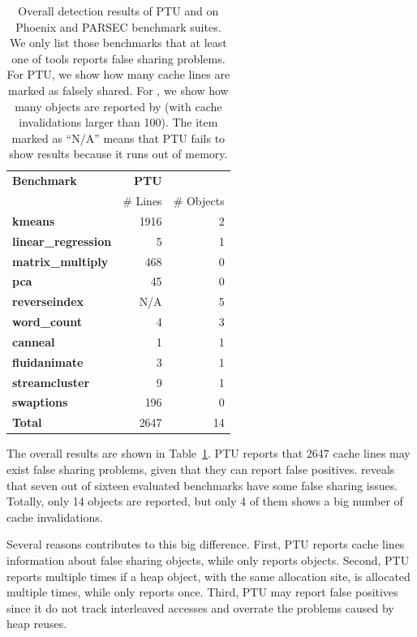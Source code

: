 \begin{table}
\centering
\begin{tabular}{l|r|r}
\hline
{\bf \small Benchmark} & {\bf \small PTU} & {\bf \small \sheriffdetect{}}\\
 & {\# Lines} & {\# Objects}\\
\hline
\small \textbf{kmeans} & 1916 &  2 \\
\small \textbf{linear\_regression} & 5 & 1 \\
\small \textbf{matrix\_multiply} & 468 & 0\\
\small \textbf{pca} & 45 & 0 \\
\small \textbf{reverseindex} & N/A & 5 \\
\small \textbf{word\_count} & 4 & 3\\
\hline
\small \textbf{canneal} & 1 & 1 \\
\small \textbf{fluidanimate} & 3 & 1 \\
\small \textbf{streamcluster} & 9 & 1\\
\small \textbf{swaptions} & 196 & 0\\
\hline
\small \textbf{Total} & 2647 & 14\\
\hline
\end{tabular}
\caption{Overall detection results of PTU and \sheriffdetect{} on Phoenix and PARSEC benchmark suites. We only list those benchmarks that at least one of tools reports false sharing problems. For PTU, we show how many cache lines are marked as falsely shared. For \sheriffdetect{}, we show how many objects are reported by \sheriffdetect{} (with cache invalidations larger than 100). The item marked as ``N/A'' means that PTU fails to show results because it runs out of memory.
\label{table:fsdetection}}
\end{table}


The overall results are shown in Table~\ref{table:fsdetection}. PTU reports that 2647 cache lines may exist false sharing problems, given that they can report false positives. \sheriffdetect{} reveals that seven out of sixteen evaluated benchmarks have some false sharing issues. Totally, only 14 objects are reported, but only 4 of them shows a big number of cache invalidations. 

Several reasons contributes to this big difference. First, PTU reports cache lines information about false sharing objects, while \SheriffDetect{} only reports objects. Second, PTU reports multiple times if a heap object, with the same allocation site, is allocated multiple times, while \SheriffDetect{} only reports once. Third, PTU may report false positives since it do not track interleaved accesses and overrate the problems caused by heap reuses. 

